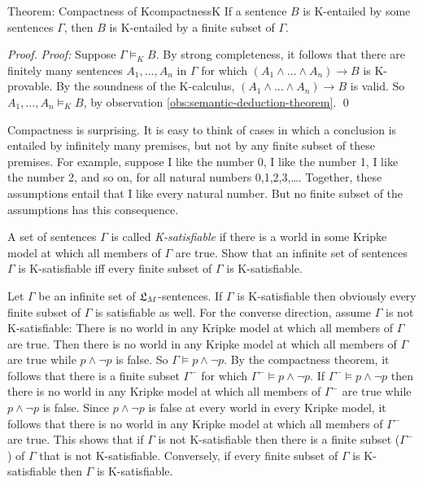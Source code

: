 \begin{theorem}{Theorem: Compactness of K}{compactnessK}
  If a sentence $B$ is K-entailed by some sentences $\Gamma$, then $B$ is
  K-entailed by a finite subset of $\Gamma$.
\end{theorem}
\begin{proof}
  \emph{Proof:} Suppose $\Gamma \models_{K} B$. By strong completeness, it
  follows that there are finitely many sentences $A_{1},\ldots,A_{n}$ in
  $\Gamma$ for which $(A_{1}\land\ldots\land A_{n}) \to B$ is K-provable. By the
  soundness of the K-calculus, $(A_{1}\land\ldots\land A_{n}) \to B$ is valid.
  So $A_{1},\ldots,A_{n} \models_{K} B$, by observation
  \ref{obs:semantic-deduction-theorem}. \qed
\end{proof}

Compactness is surprising. It is easy to think of cases in which a conclusion is
entailed by infinitely many premises, but not by any finite subset of these
premises. For example, suppose I like the number 0, I like the number 1, I like
the number 2, and so on, for all natural numbers 0,1,2,3,\ldots. Together, these
assumptions entail that I like every natural number. But no finite subset of the
assumptions has this consequence.

\begin{exercise}
  A set of sentences $\Gamma$ is called \emph{K-satisfiable} if there is a world
  in some Kripke model at which all members of $\Gamma$ are true. Show that an
  infinite set of sentences $\Gamma$ is K-satisfiable iff every finite subset of
  $\Gamma$ is K-satisfiable.
\end{exercise}
\begin{solution}
  Let $\Gamma$ be an infinite set of $\mathfrak{L}_{M}$-sentences. If $\Gamma$ is
  K-satisfiable then obviously every finite subset of $\Gamma$ is satisfiable as
  well. For the converse direction, assume $\Gamma$ is not K-satisfiable: There
  is no world in any Kripke model at which all members of $\Gamma$ are true.
  Then there is no world in any Kripke model at which all members of $\Gamma$
  are true while $p \land \neg p$ is false. So $\Gamma \models p\land \neg p$.
  By the compactness theorem, it follows that there is a finite subset
  $\Gamma^{-}$ for which $\Gamma^{-} \models p \land \neg p$. If
  $\Gamma^{-} \models p \land \neg p$ then there is no world in any Kripke model
  at which all members of $\Gamma^{-}$ are true while $p \land \neg p$ is false.
  Since $p\land \neg p$ is false at every world in every Kripke model, it
  follows that there is no world in any Kripke model at which all members of
  $\Gamma^{-}$ are true. This shows that if $\Gamma$ is not K-satisfiable then
  there is a finite subset ($\Gamma^{-}$) of $\Gamma$ that is not K-satisfiable.
  Conversely, if every finite subset of $\Gamma$ is K-satisfiable then $\Gamma$
  is K-satisfiable.
\end{solution}

